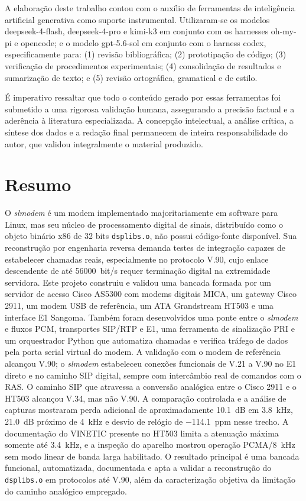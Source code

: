 \documentclass[12pt,a4paper]{article}
\newcommand{\slmodem}{\textit{slmodem}}
\newcommand{\dsplibs}{\texttt{dsplibs.o}}
\begin{document}
\begingroup
{}
\setlength{\emergencystretch}{0.5em}
A elaboração deste trabalho contou com o auxílio de ferramentas de inteligência
artificial generativa como suporte instrumental. Utilizaram-se os modelos
\mbox{deepseek-4-flash}, \mbox{deepseek-4-pro} e \mbox{kimi-k3} em conjunto com
os harnesses \mbox{oh-my-pi} e opencode; e o modelo \mbox{gpt-5.6-sol} em
conjunto com o harness codex, especificamente para: (1) revisão bibliográfica;
(2) prototipação de código; (3) verificação de procedimentos experimentais; (4)
consolidação de resultados e sumarização de texto; e (5) revisão ortográfica,
gramatical e de estilo.
\par
\endgroup

É imperativo ressaltar que todo o conteúdo gerado por essas ferramentas foi
submetido a uma rigorosa validação humana, assegurando a precisão factual e a
aderência à literatura especializada. A concepção intelectual, a análise crítica,
a síntese dos dados e a redação final permanecem de inteira responsabilidade do
autor, que validou integralmente o material produzido.

\clearpage
\section*{Resumo}

O \slmodem{} é um modem implementado majoritariamente em software para Linux,
mas seu núcleo de processamento digital de sinais, distribuído como o objeto
binário x86 de 32 bits \dsplibs, não possui código-fonte disponível. Sua
reconstrução por engenharia reversa demanda testes de integração capazes de
estabelecer chamadas reais, especialmente no protocolo V.90, cujo enlace
descendente de até \SI{56000}{bit/s} requer terminação digital na extremidade
servidora. Este projeto construiu e validou uma bancada formada por um servidor de
acesso Cisco AS5300 com modems digitais MICA, um gateway Cisco 2911, um modem USB
de referência, um ATA Grandstream HT503 e uma interface E1 Sangoma. Também foram
desenvolvidos uma ponte entre o \slmodem{} e fluxos PCM, transportes SIP/RTP e E1,
uma ferramenta de sinalização PRI e um orquestrador Python que automatiza chamadas
e verifica tráfego de dados pela porta serial virtual do modem. A validação com o
modem de referência alcançou V.90; o \slmodem{} estabeleceu conexões funcionais de
V.21 a V.90 no E1 direto e no caminho SIP digital, sempre com intercâmbio real de
comandos com o RAS. O caminho SIP que atravessa a conversão analógica entre o Cisco
2911 e o HT503 alcançou V.34, mas não V.90. A comparação controlada e a análise de
capturas mostraram perda adicional de aproximadamente \SI{10.1}{dB} em
\SI{3.8}{kHz}, \SI{21.0}{dB} próximo de \SI{4}{kHz} e desvio de relógio de
\SI{-114.1}{ppm} nesse trecho. A documentação do VINETIC presente no HT503 limita
a atenuação máxima somente até \SI{3.4}{kHz}, e a inspeção do aparelho mostrou
operação PCMA/\SI{8}{kHz} sem modo linear de banda larga habilitado. O resultado principal
é uma bancada funcional, automatizada, documentada e apta a validar a reconstrução
do \dsplibs{} em protocolos até V.90, além da caracterização objetiva da limitação
do caminho analógico empregado.
\end{document}
